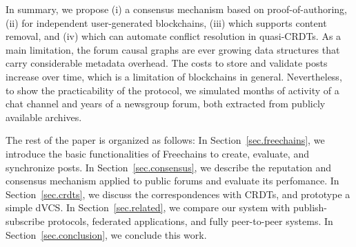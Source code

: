 \documentclass[12pt]{article}
\newcommand{\FC}       {Freechains\xspace}
\begin{document}
In summary, we propose
    (i)   a consensus mechanism based on proof-of-authoring,
    (ii)  for independent user-generated blockchains,
    (iii) which supports content removal, and
    (iv)  which can automate conflict resolution in quasi-CRDTs.
%
As a main limitation, the forum causal graphs are ever growing data structures
that carry considerable metadata overhead.
The costs to store and validate posts increase over time, which is a limitation
of blockchains in general.
%
Nevertheless, to show the practicability of the protocol, we simulated months
of activity of a chat channel and years of a newsgroup forum, both extracted
from publicly available archives.

The rest of the paper is organized as follows:
In Section~\ref{sec.freechains}, we introduce the basic functionalities of \FC
to create, evaluate, and synchronize posts.
In Section~\ref{sec.consensus}, we describe the reputation and consensus
mechanism applied to public forums and evaluate its perfomance.
In Section~\ref{sec.crdts}, we discuss the correspondences with CRDTs, and
prototype a simple dVCS.
In Section~\ref{sec.related}, we compare our system with publish-subscribe
protocols, federated applications, and fully peer-to-peer systems.
In Section~\ref{sec.conclusion}, we conclude this work.
\end{document}
